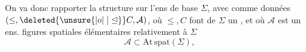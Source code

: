  On va donc rapporter la structure sur l'ens de base $\Sigma$, avec comme données $(\leq,\deleted{\unsure{\mathrel{|o|}|\trianglelefteq}}C,\mathcal A)$, où $\leq,C$ font de $\Sigma$ un , et où $\mathcal A$ est un  ens.  figures spatiales élémentaires  relativement à $\Sigma$
\[
\mathcal A\subset\mathrm{At}\,\mathrm{spat}(\Sigma),
\]
